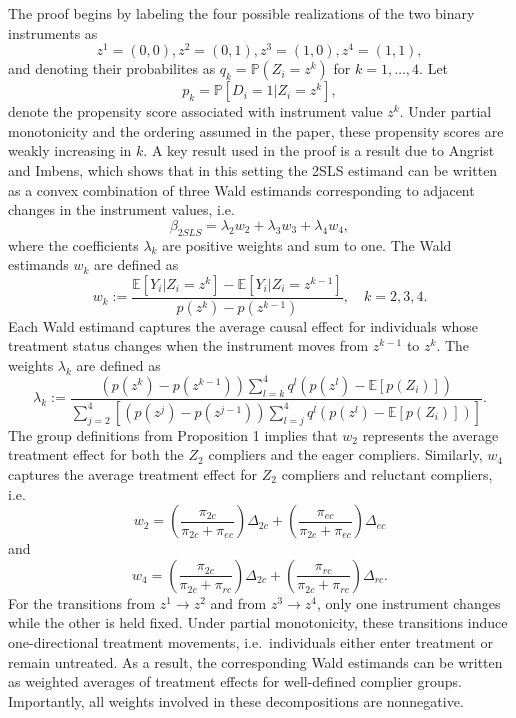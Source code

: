 \documentclass[
  12pt,
  a4paper,
  oneside]{article}
\begin{document}
The proof begins by labeling the four possible realizations of the two
binary instruments as \begin{equation}
z^1 = (0,0), z^2 = (0,1), z^3 = (1,0), z^4 = (1,1),
\end{equation} and denoting their probabilites as
\(q_k = \mathbb{P}(Z_i = z^k)\) for \(k = 1, \dots, 4\). Let
\begin{equation}
p_k = \mathbb{P}[D_i = 1 | Z_i = z^k],
\end{equation} denote the propensity score associated with instrument
value \(z^k\). Under partial monotonicity and the ordering assumed in
the paper, these propensity scores are weakly increasing in \(k\). A key
result used in the proof is a result due to Angrist and Imbens, which
shows that in this setting the 2SLS estimand can be written as a convex
combination of three Wald estimands corresponding to adjacent changes in
the instrument values, i.e. \begin{equation}
\beta_{2SLS} = \lambda_2 w_2 + \lambda_3 w_3 + \lambda_4 w_4,
\end{equation} where the coefficients \(\lambda_k\) are positive weights
and sum to one. The Wald estimands \(w_k\) are defined as
\begin{equation}
w_k := \frac{\mathbb{E}[Y_i | Z_i = z^k] - \mathbb{E}[Y_i | Z_i = z^{k-1}]}{p(z^k) - p(z^{k-1})}, \quad k = 2,3,4.
\end{equation} Each Wald estimand captures the average causal effect for
individuals whose treatment status changes when the instrument moves
from \(z^{k-1}\) to \(z^k\). The weights \(\lambda_k\) are defined as
\begin{equation}
\lambda_k := \frac{(p(z^k) - p(z^{k-1}))\sum_{l=k}^4 q^l(p(z^l) - \mathbb{E}[p(Z_i)])}{\sum_{j=2}^4 [(p(z^j) - p(z^{j-1})) \sum_{l=j}^4 q^l (p(z^l) - \mathbb{E}[p(Z_i)])]}.
\end{equation} The group definitions from Proposition 1 implies that
\(w_2\) represents the average treatment effect for both the \(Z_2\)
compliers and the eager compliers. Similarly, \(w_4\) captures the
average treatment effect for \(Z_2\) compliers and reluctant compliers,
i.e. \begin{equation}
w_2 = \left(\frac{\pi_{2c}}{\pi_{2c} + \pi_{ec}}\right)\Delta_{2c} + \left(\frac{\pi_{ec}}{\pi_{2c} + \pi_{ec}}\right)\Delta_{ec}
\end{equation} and \begin{equation}
w_4 = \left(\frac{\pi_{2c}}{\pi_{2c} + \pi_{rc}}\right)\Delta_{2c} + \left(\frac{\pi_{rc}}{\pi_{2c} + \pi_{rc}}\right)\Delta_{rc}.
\end{equation} For the transitions from \(z^1 \rightarrow z^2\) and from
\(z^3 \rightarrow z^4\), only one instrument changes while the other is
held fixed. Under partial monotonicity, these transitions induce
one-directional treatment movements, i.e.~individuals either enter
treatment or remain untreated. As a result, the corresponding Wald
estimands can be written as weighted averages of treatment effects for
well-defined complier groups. Importantly, all weights involved in these
decompositions are nonnegative.
\end{document}
